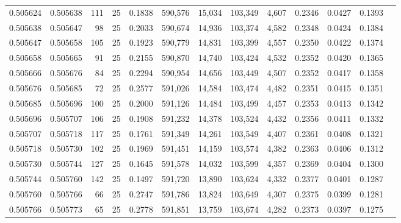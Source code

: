 \begin{tabular}{rrrrrrrrrrrrr}
0.505624 & 0.505638 & 111 &  25 &                                     0.1838 & 590,576 &  15,034 & 103,349 &   4,607 & 0.2346 & 0.0427 & 0.1393 \\
0.505638 & 0.505647 &  98 &  25 &                                     0.2033 & 590,674 &  14,936 & 103,374 &   4,582 & 0.2348 & 0.0424 & 0.1384 \\
0.505647 & 0.505658 & 105 &  25 &                                     0.1923 & 590,779 &  14,831 & 103,399 &   4,557 & 0.2350 & 0.0422 & 0.1374 \\
0.505658 & 0.505665 &  91 &  25 &                                     0.2155 & 590,870 &  14,740 & 103,424 &   4,532 & 0.2352 & 0.0420 & 0.1365 \\
0.505666 & 0.505676 &  84 &  25 &                                     0.2294 & 590,954 &  14,656 & 103,449 &   4,507 & 0.2352 & 0.0417 & 0.1358 \\
0.505676 & 0.505685 &  72 &  25 &                                     0.2577 & 591,026 &  14,584 & 103,474 &   4,482 & 0.2351 & 0.0415 & 0.1351 \\
0.505685 & 0.505696 & 100 &  25 &                                     0.2000 & 591,126 &  14,484 & 103,499 &   4,457 & 0.2353 & 0.0413 & 0.1342 \\
0.505696 & 0.505707 & 106 &  25 &                                     0.1908 & 591,232 &  14,378 & 103,524 &   4,432 & 0.2356 & 0.0411 & 0.1332 \\
0.505707 & 0.505718 & 117 &  25 &                                     0.1761 & 591,349 &  14,261 & 103,549 &   4,407 & 0.2361 & 0.0408 & 0.1321 \\
0.505718 & 0.505730 & 102 &  25 &                                     0.1969 & 591,451 &  14,159 & 103,574 &   4,382 & 0.2363 & 0.0406 & 0.1312 \\
0.505730 & 0.505744 & 127 &  25 &                                     0.1645 & 591,578 &  14,032 & 103,599 &   4,357 & 0.2369 & 0.0404 & 0.1300 \\
0.505744 & 0.505760 & 142 &  25 &                                     0.1497 & 591,720 &  13,890 & 103,624 &   4,332 & 0.2377 & 0.0401 & 0.1287 \\
0.505760 & 0.505766 &  66 &  25 &                                     0.2747 & 591,786 &  13,824 & 103,649 &   4,307 & 0.2375 & 0.0399 & 0.1281 \\
0.505766 & 0.505773 &  65 &  25 &                                     0.2778 & 591,851 &  13,759 & 103,674 &   4,282 & 0.2373 & 0.0397 & 0.1275 \\

\end{tabular}
